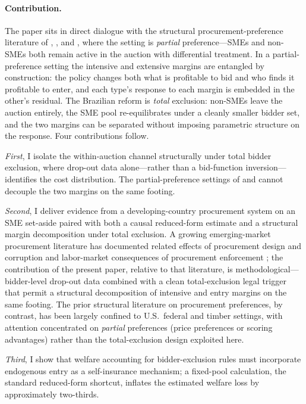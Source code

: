 \paragraph{Contribution.} The paper sits in direct dialogue with the structural procurement-preference literature of \citet{marion2007}, \citet{krasnokutskaya2011}, and \citet{atheyseira2011}, where the setting is \emph{partial} preference---SMEs and non-SMEs both remain active in the auction with differential treatment. In a partial-preference setting the intensive and extensive margins are entangled by construction: the policy changes both what is profitable to bid and who finds it profitable to enter, and each type's response to each margin is embedded in the other's residual. The Brazilian reform is \emph{total} exclusion: non-SMEs leave the auction entirely, the SME pool re-equilibrates under a cleanly smaller bidder set, and the two margins can be separated without imposing parametric structure on the response. Four contributions follow.

\emph{First}, I isolate the within-auction channel structurally under total bidder exclusion, where drop-out data alone---rather than a bid-function inversion---identifies the cost distribution. The partial-preference settings of \citet{krasnokutskaya2011} and \citet{atheyseira2011} cannot decouple the two margins on the same footing.

\emph{Second}, I deliver evidence from a developing-country procurement system on an SME set-aside paired with both a causal reduced-form estimate and a structural margin decomposition under total exclusion. A growing emerging-market procurement literature has documented related effects of procurement design and corruption \citep{decarolis2024, colonnelli2022} and labor-market consequences of procurement enforcement \citep{cabral2017, szerman2023}; the contribution of the present paper, relative to that literature, is methodological---bidder-level drop-out data combined with a clean total-exclusion legal trigger that permit a structural decomposition of intensive and entry margins on the same footing. The prior structural literature on procurement preferences, by contrast, has been largely confined to U.S.\ federal and timber settings, with attention concentrated on \emph{partial} preferences (price preferences or scoring advantages) rather than the total-exclusion design exploited here.

\emph{Third}, I show that welfare accounting for bidder-exclusion rules must incorporate endogenous entry as a self-insurance mechanism; a fixed-pool calculation, the standard reduced-form shortcut, inflates the estimated welfare loss by approximately two-thirds.

